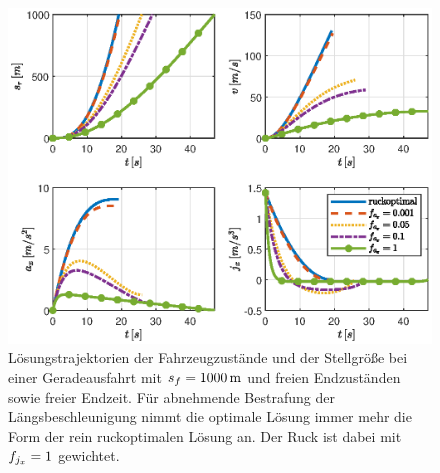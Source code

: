 \begin{figure}[h] 
	\centering
	\includegraphics[width=0.8\linewidth]{./Bilder/Ergebnisse/Geradeausfahrt/var_fax.eps}
	\caption{Lösungstrajektorien der Fahrzeugzustände und der Stellgröße bei einer Geradeausfahrt mit $s_f=1000\,\mathrm{m}$ und freien Endzuständen sowie freier Endzeit. Für abnehmende Bestrafung der Längsbeschleunigung nimmt die optimale Lösung immer mehr die Form der rein ruckoptimalen Lösung an. Der Ruck ist dabei mit $f_{j_x} = 1$ gewichtet.}
	\label{fig:var_fax}
\end{figure}

